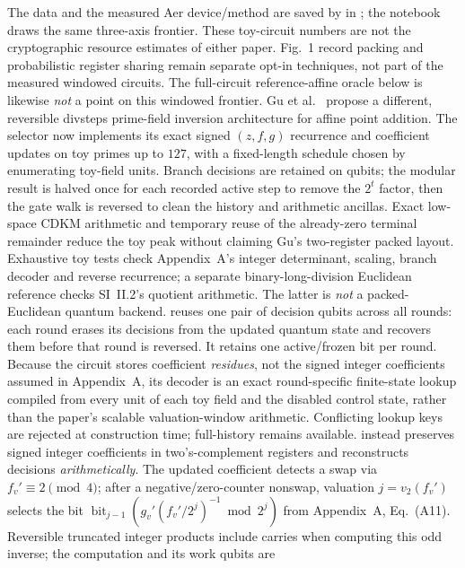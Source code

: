 The data and the measured Aer device/method are saved by
 in ; the notebook draws
the same three-axis frontier. These toy-circuit numbers are not the
cryptographic resource estimates of either paper. Fig.~1 record packing and
probabilistic register sharing remain separate opt-in techniques, not part of
the measured windowed circuits. The full-circuit reference-affine oracle
below is likewise \emph{not} a point on this windowed frontier.
Gu et al.\ \cite{ec:gu26} propose a different, reversible divsteps
prime-field inversion architecture for affine point addition. The
 selector now implements its exact signed $(z,f,g)$ recurrence
and coefficient updates on toy primes up to $127$, with a fixed-length schedule
chosen by enumerating toy-field units. Branch decisions are retained on
qubits; the modular result is halved once for each recorded active step to
remove the $2^t$ factor, then the gate walk is reversed to clean the
history and arithmetic ancillas. Exact low-space CDKM arithmetic and temporary
reuse of the already-zero terminal remainder reduce the toy peak without
claiming Gu's two-register packed layout. Exhaustive toy tests check Appendix~A's
integer determinant, scaling, branch decoder and reverse recurrence; a
separate binary-long-division Euclidean reference checks SI~II.2's quotient
arithmetic. The latter is \emph{not} a packed-Euclidean quantum backend.
 reuses one pair of decision qubits across all rounds:
each round erases its decisions from the updated quantum state and recovers
them before that round is reversed. It retains one active/frozen bit per
round. Because the circuit stores coefficient \emph{residues}, not the signed
integer coefficients assumed in Appendix~A, its decoder is an exact
round-specific finite-state lookup compiled from every unit of each toy
field and the disabled control state, rather than the paper's scalable
valuation-window arithmetic. Conflicting lookup keys are rejected at
construction time; full-history  remains available.
 instead preserves signed integer coefficients in
two's-complement registers and reconstructs decisions \emph{arithmetically}.
The updated coefficient detects a swap via $f_v'\equiv2\pmod4$; after a
negative/zero-counter nonswap, valuation $j=v_2(f_v')$ selects the bit
$\operatorname{bit}_{j-1}(g_v'(f_v'/2^j)^{-1}\bmod2^j)$ from
Appendix~A, Eq.~(A11). Reversible truncated integer products include carries
when computing this odd inverse; the computation and its work qubits are
